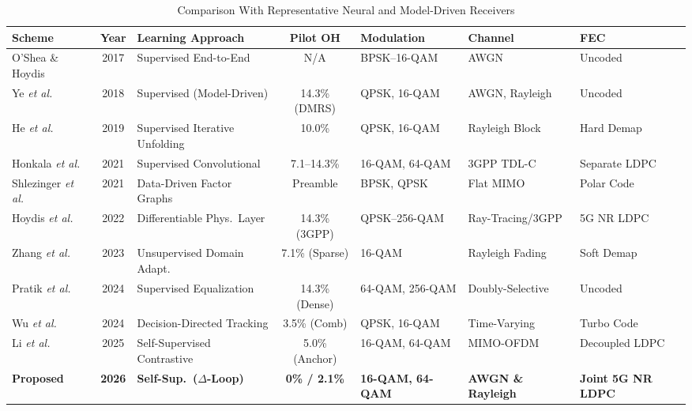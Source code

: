 \documentclass{ieeeaccess}
\begin{document}
\begin{table}[!t]
\caption{Comparison With Representative Neural and Model-Driven Receivers}
\label{tab:sota_comparison}
\centering
\footnotesize
\setlength{\tabcolsep}{4pt}
\begin{tabularx}{\textwidth}{l c p{3.0cm} c p{2.0cm} p{2.4cm} X}
\toprule
\textbf{Scheme} & \textbf{Year} & \textbf{Learning Approach} &
\textbf{Pilot OH} & \textbf{Modulation} & \textbf{Channel} & \textbf{FEC} \\
\midrule
O'Shea \& Hoydis \cite{oshea2017}         & 2017 & Supervised End-to-End         & N/A              & BPSK--16-QAM    & AWGN              & Uncoded \\
Ye \textit{et al.} \cite{ye2018}          & 2018 & Supervised (Model-Driven)     & 14.3\% (DMRS)    & QPSK, 16-QAM    & AWGN, Rayleigh    & Uncoded \\
He \textit{et al.} \cite{he2019}          & 2019 & Supervised Iterative Unfolding & 10.0\%          & QPSK, 16-QAM    & Rayleigh Block    & Hard Demap \\
Honkala \textit{et al.} \cite{honkala2021}& 2021 & Supervised Convolutional      & 7.1--14.3\%      & 16-QAM, 64-QAM  & 3GPP TDL-C        & Separate LDPC \\
Shlezinger \textit{et al.} \cite{shlezinger2021}& 2021 & Data-Driven Factor Graphs & Preamble     & BPSK, QPSK      & Flat MIMO         & Polar Code \\
Hoydis \textit{et al.} \cite{hoydis2022}  & 2022 & Differentiable Phys.\ Layer   & 14.3\% (3GPP)    & QPSK--256-QAM   & Ray-Tracing/3GPP  & 5G NR LDPC \\
Zhang \textit{et al.} \cite{zhang2023}    & 2023 & Unsupervised Domain Adapt.    & 7.1\% (Sparse)   & 16-QAM          & Rayleigh Fading   & Soft Demap \\
Pratik \textit{et al.} \cite{pratik2024}  & 2024 & Supervised Equalization       & 14.3\% (Dense)   & 64-QAM, 256-QAM & Doubly-Selective  & Uncoded \\
Wu \textit{et al.} \cite{wu2024}          & 2024 & Decision-Directed Tracking    & 3.5\% (Comb)     & QPSK, 16-QAM    & Time-Varying      & Turbo Code \\
Li \textit{et al.} \cite{li2025}          & 2025 & Self-Supervised Contrastive   & 5.0\% (Anchor)   & 16-QAM, 64-QAM  & MIMO-OFDM         & Decoupled LDPC \\
\textbf{Proposed}                         & \textbf{2026} & \textbf{Self-Sup.\ ($\Delta$-Loop)} &
  \textbf{0\% / 2.1\%} & \textbf{16-QAM, 64-QAM} & \textbf{AWGN \& Rayleigh} & \textbf{Joint 5G NR LDPC} \\
\bottomrule
\end{tabularx}
\end{table}
\end{document}
